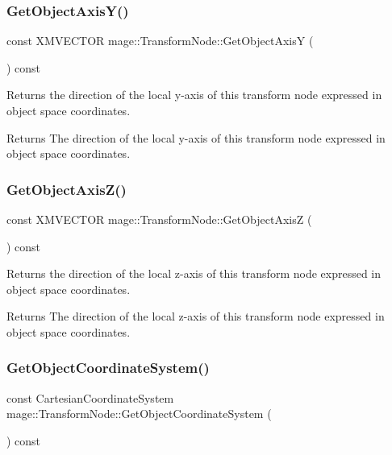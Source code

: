 \subsubsection{\texorpdfstring{Get\+Object\+Axis\+Y()}{GetObjectAxisY()}}
{\footnotesize\ttfamily const X\+M\+V\+E\+C\+T\+OR mage\+::\+Transform\+Node\+::\+Get\+Object\+AxisY (\begin{DoxyParamCaption}{ }\end{DoxyParamCaption}) const}

Returns the direction of the local y-\/axis of this transform node expressed in object space coordinates.

\begin{DoxyReturn}{Returns}
The direction of the local y-\/axis of this transform node expressed in object space coordinates. 
\end{DoxyReturn}
\hypertarget{classmage_1_1_transform_node_a425c9ba06004d1de35ca97813524882a}{}\label{classmage_1_1_transform_node_a425c9ba06004d1de35ca97813524882a} 
\subsubsection{\texorpdfstring{Get\+Object\+Axis\+Z()}{GetObjectAxisZ()}}
{\footnotesize\ttfamily const X\+M\+V\+E\+C\+T\+OR mage\+::\+Transform\+Node\+::\+Get\+Object\+AxisZ (\begin{DoxyParamCaption}{ }\end{DoxyParamCaption}) const}

Returns the direction of the local z-\/axis of this transform node expressed in object space coordinates.

\begin{DoxyReturn}{Returns}
The direction of the local z-\/axis of this transform node expressed in object space coordinates. 
\end{DoxyReturn}
\hypertarget{classmage_1_1_transform_node_aa293ee88682b0d4ca6f5d7d6439595aa}{}\label{classmage_1_1_transform_node_aa293ee88682b0d4ca6f5d7d6439595aa} 
\subsubsection{\texorpdfstring{Get\+Object\+Coordinate\+System()}{GetObjectCoordinateSystem()}}
{\footnotesize\ttfamily const Cartesian\+Coordinate\+System mage\+::\+Transform\+Node\+::\+Get\+Object\+Coordinate\+System (\begin{DoxyParamCaption}{ }\end{DoxyParamCaption}) const}

